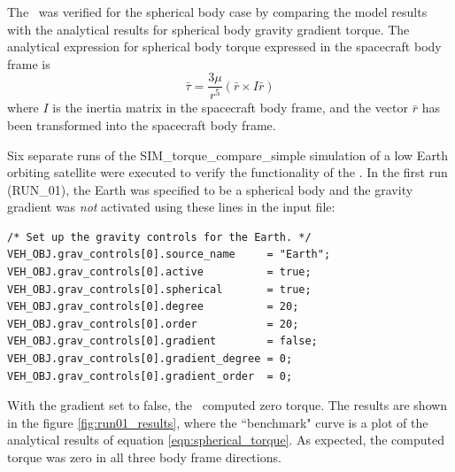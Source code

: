 The \gravitytorqueDesc\ was verified for the spherical body case by comparing
the model results with the analytical results for spherical body gravity 
gradient torque. The analytical expression for spherical body torque 
expressed in the spacecraft body frame is\cite{SJ}
\begin{equation}\label{eqn:spherical_torque}
\bar{\tau}=\frac{3\mu}{r^5} \left(\bar{r}\times I \bar{r}\right)
\end{equation}
where $I$ is the inertia matrix in the spacecraft body frame, and the 
vector $\bar{r}$ has been transformed into the spacecraft body frame.

Six separate runs of the SIM\_torque\_compare\_simple simulation of a low 
Earth orbiting satellite were executed to verify the functionality
of the \gravitytorqueDesc. In the first run (RUN\_01), the
Earth was specified to be a spherical body and the gravity gradient was
\emph{not} activated using these lines in the input file:
\begin{verbatim}
/* Set up the gravity controls for the Earth. */
VEH_OBJ.grav_controls[0].source_name     = "Earth";
VEH_OBJ.grav_controls[0].active          = true;
VEH_OBJ.grav_controls[0].spherical       = true;
VEH_OBJ.grav_controls[0].degree          = 20;
VEH_OBJ.grav_controls[0].order           = 20;
VEH_OBJ.grav_controls[0].gradient        = false;
VEH_OBJ.grav_controls[0].gradient_degree = 0;
VEH_OBJ.grav_controls[0].gradient_order  = 0;
\end{verbatim}
With the gradient set to false, the \gravitytorqueDesc\ computed zero torque.
The results are shown in the figure \ref{fig:run01_results}, where 
the ``benchmark" curve is a plot of the analytical results of 
equation \ref{eqn:spherical_torque}.  As expected, the
computed torque was zero in all three body frame directions.
